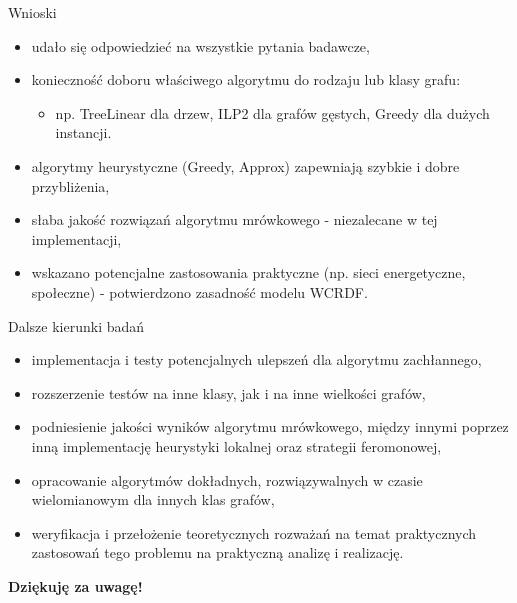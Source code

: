 \documentclass[polish,aspectratio=169]{beamer}
\begin{document}
\begin{frame}{Wnioski}
\begin{itemize}
    \item udało się odpowiedzieć na wszystkie pytania badawcze,
    \item konieczność doboru właściwego algorytmu do rodzaju lub klasy grafu:
    \begin{itemize}
        \item np. TreeLinear dla drzew, ILP2 dla grafów gęstych, Greedy dla dużych instancji.
    \end{itemize}
    \item algorytmy heurystyczne (Greedy, Approx) zapewniają szybkie i dobre przybliżenia,
    \item słaba jakość rozwiązań algorytmu mrówkowego - niezalecane w tej implementacji,
    \item wskazano potencjalne zastosowania praktyczne (np. sieci energetyczne, społeczne) - potwierdzono zasadność modelu WCRDF.
\end{itemize}
\end{frame}


\begin{frame}{Dalsze kierunki badań}
    \begin{itemize}
        \item implementacja i testy potencjalnych ulepszeń dla algorytmu zachłannego,
        \item rozszerzenie testów na inne klasy, jak i na inne wielkości grafów,
        \item podniesienie jakości wyników algorytmu mrówkowego, między innymi poprzez inną implementację heurystyki lokalnej oraz strategii feromonowej,
        \item opracowanie algorytmów dokładnych, rozwiązywalnych w czasie wielomianowym dla innych klas grafów,
        \item weryfikacja i przełożenie teoretycznych rozważań na temat praktycznych zastosowań tego problemu na praktyczną analizę i realizację.
    \end{itemize}
\end{frame}

\begin{frame}[c]
    \centering
    \Huge \textbf{Dziękuję za uwagę!}
\end{frame}


\pglastframe
\end{document}
